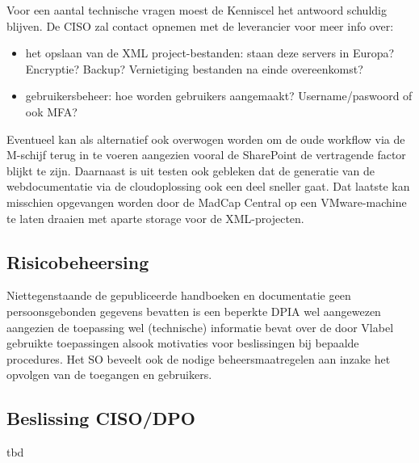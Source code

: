 \documentclass[11pt]{article}
\begin{document}
Voor een aantal technische vragen moest de Kenniscel het antwoord schuldig blijven. De CISO zal contact opnemen met de leverancier
voor meer info over:
\begin{itemize}
\item het opslaan van de XML project-bestanden: staan deze servers in Europa? Encryptie? Backup? Vernietiging bestanden na einde overeenkomst?
\item gebruikersbeheer: hoe worden gebruikers aangemaakt? Username/paswoord of ook MFA?
\end{itemize}

Eventueel kan als alternatief ook overwogen worden om de oude workflow via de M-schijf terug in te voeren aangezien vooral de 
SharePoint de vertragende factor blijkt te zijn. Daarnaast is uit testen ook gebleken dat de generatie van de webdocumentatie via
de cloudoplossing ook een deel sneller gaat. Dat laatste kan misschien opgevangen worden door de MadCap Central op een VMware-machine
te laten draaien met aparte storage voor de XML-projecten.

\subsection{Risicobeheersing}
\label{sec:org0077ee7}
Niettegenstaande de gepubliceerde handboeken en documentatie geen persoonsgebonden gegevens bevatten is een beperkte DPIA wel
aangewezen aangezien de toepassing wel (technische) informatie bevat over de door Vlabel gebruikte toepassingen alsook motivaties
voor beslissingen bij bepaalde procedures.
Het SO beveelt ook de nodige beheersmaatregelen aan inzake het opvolgen van de toegangen en gebruikers.

\subsection{Beslissing CISO/DPO}
\label{sec:orgefe1c9d}
tbd
\end{document}

